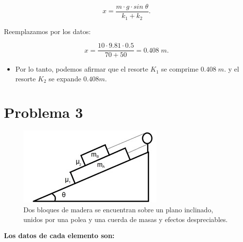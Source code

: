 \documentclass[a4paper,12pt]{article} %
\begin{document}
\begin{center}
    \[{x = \frac{ m \cdot g \cdot sin \; \theta }{k_1 + k_2}}.\]
\end{center}

\begin{justify}
    Reemplazamos por los datos:
\end{justify}

\begin{center}
    \[
    \boxed{x =\frac{10 \cdot 9.81 \cdot 0.5}{70+50} = 0.408 \; m. }
    \]
\end{center}

\begin{itemize}
    \item Por lo tanto, podemos afirmar que el resorte \(K_1\) se comprime \( 0.408 \; m.\) y el resorte \(K_2\) se expande \( 0.408 m.\)
\end{itemize}

\newpage

\section*{Problema 3} %

\begin{figure}[h!]
    \centering
    \includegraphics[width=\textwidth]{Imagen2.jpg}
    \caption{Dos bloques de madera se encuentran sobre un plano inclinado, unidos por una polea y una cuerda de masas y efectos despreciables.}
\end{figure}

\begin{justify}
    \textbf{Los datos de cada elemento son:}
\end{justify}
\end{document}

